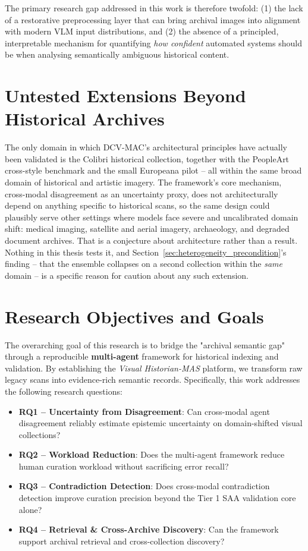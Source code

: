 \documentclass[12pt,a4paper]{report}
\begin{document}
The primary research gap addressed in this work is therefore twofold: (1) the lack of a restorative preprocessing layer that can bring archival images into alignment with modern VLM input distributions, and (2) the absence of a principled, interpretable mechanism for quantifying \textit{how confident} automated systems should be when analysing semantically ambiguous historical content.

\section{Untested Extensions Beyond Historical Archives}
The only domain in which DCV-MAC's architectural principles have actually been validated is the Colibri historical collection, together with the PeopleArt cross-style benchmark and the small Europeana pilot -- all within the same broad domain of historical and artistic imagery. The framework's core mechanism, cross-modal disagreement as an uncertainty proxy, does not architecturally depend on anything specific to historical scans, so the same design could plausibly serve other settings where models face severe and uncalibrated domain shift: medical imaging, satellite and aerial imagery, archaeology, and degraded document archives. That is a conjecture about architecture rather than a result. Nothing in this thesis tests it, and Section~\ref{sec:heterogeneity_precondition}'s finding -- that the ensemble collapses on a second collection within the \emph{same} domain -- is a specific reason for caution about any such extension.

\section{Research Objectives and Goals}
The overarching goal of this research is to bridge the "archival semantic gap" through a reproducible \textbf{multi-agent} framework for historical indexing and validation. By establishing the \textit{Visual Historian-MAS} platform, we transform raw legacy scans into evidence-rich semantic records. Specifically, this work addresses the following research questions:
\begin{itemize}
    \item \textbf{RQ1 -- Uncertainty from Disagreement}: Can cross-modal agent disagreement reliably estimate epistemic uncertainty on domain-shifted visual collections?
    \item \textbf{RQ2 -- Workload Reduction}: Does the multi-agent framework reduce human curation workload without sacrificing error recall?
    \item \textbf{RQ3 -- Contradiction Detection}: Does cross-modal contradiction detection improve curation precision beyond the Tier 1 SAA validation core alone?
    \item \textbf{RQ4 -- Retrieval \& Cross-Archive Discovery}: Can the framework support archival retrieval and cross-collection discovery?
\end{itemize}
\end{document}
